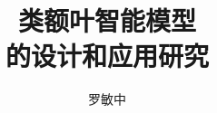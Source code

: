 \documentclass[master]{ustcthesis}
\title{类额叶智能模型\\的设计和应用研究}
\author{罗敏中}
\begin{document}
\maketitle

%
%
%

\frontmatter

\tableofcontents
\listoffigures
\listoftables
\listofalgorithms  %
% 

\newtheorem{proof_idea}{证明思路}
\newtheorem{thm}{定理}

\mainmatter
%










\backmatter



\end{document}
